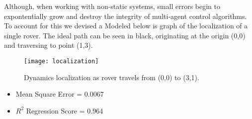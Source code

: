 Although, when working with non-static systems, small errors begin to expontentially grow and destroy the integrity of multi-agent control algorithms. To account for this we devised a 
Modeled below is graph of the localization of a single rover. The ideal path can be seen in black, originating at the origin (0,0) and traversing to point (1,3). 

\begin{figure} 
	\centering
	\texttt{[image: localization]}
	\caption{Dynamics localization as rover travels from (0,0) to (3,1).}
	\label{fig:dynamic}
\end{figure}


\begin{itemize}
	\item Mean Square Error = 0.0067 
	\item $R^2$ Regression Score = 0.964 
\end{itemize}


